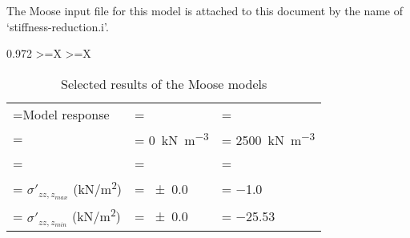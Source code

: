 The Moose input file for this model is attached to this document by the name of
‘stiffness-reduction.i’.


\begin{table}[htbp]
    \centering
    \caption{Selected results of the Moose models}
    \label{fully-saturated-undrained-compression:moose-results}

    \begin{tabularx}{0.972\hsize}{
            >{\hsize\linewidth=\hsize}X
            >{\hsize\linewidth=\hsize}X}
        {\begin{tabularx}{1\linewidth}{
                     >{\hsize\linewidth=\hsize}X
                     >{\hsize\linewidth=\hsize\hspace{-5pt}}Y
                     >{\hsize\linewidth=\hsize\hspace{-5pt}}Y}
                 \toprule
                 Model response                                                                                &                                                                                    \\
                 {}                                                                                            & \qty[per-mode = symbol]{0}{\kilo\newton\per\cubic\metre} & \qty[per-mode = symbol]{2500}{\kilo\newton\per\cubic\metre} \\
                 \midrule

                                                                                                                                                                                                 \\
                 \hspace{1em} $\sigma'_{zz,z_{max}}$ (\unit[per-mode = symbol]{\kilo\newton\per\square\metre}) & \qty{\pm0.0}{}                                           & \qty{-1.0}{}                                                \\
                 \hspace{1em} $\sigma'_{zz,z_{min}}$ (\unit[per-mode = symbol]{\kilo\newton\per\square\metre}) & \qty{\pm0.0}{}                                           & \qty{-25.53}{}                                              \\


\end{tabularx}}
\end{tabularx}
\end{table}

